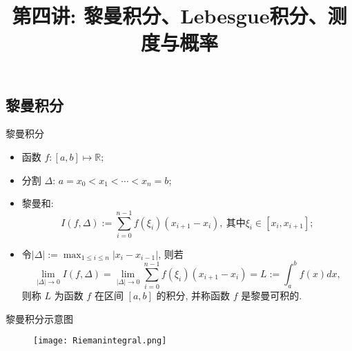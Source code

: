 \title[概率论]{第四讲: 黎曼积分、{\rm Lebesgue}积分、测度与概率 }
\date{}
{ 
	\begin{frame}
		\titlepage
	\end{frame}
}

\subsection{黎曼积分}
\begin{frame}{黎曼积分}
	\begin{itemize}[<+-|alert@+>]
		\item 函数 $f:[a,b]\mapsto \mathbb{R}$;
		\item 分割 $\Delta$: $a=x_0<x_1<\cdots<x_n=b$;
		\item 黎曼和:
		\[I(f,\Delta):=\sum_{i=0}^{n-1}f(\xi_i)(x_{i+1}-x_i), \ \mbox{其中} \xi_i\in[x_i,x_{i+1}]; \]
		\item 令$|\Delta|:=\max_{1\leq i\leq n}|x_i-x_{i-1}|$, 则若
		\[\lim_{|\Delta|\rightarrow 0}I(f,\Delta)=\lim_{|\Delta|\rightarrow 0}\sum_{i=0}^{n-1}f(\xi_i)(x_{i+1}-x_i)=L:=\int_a^bf(x)dx,\]
		则称 $L$ 为函数 $f$ 在区间 $[a,b]$ 的积分, 并称函数 $f$ 是黎曼可积的.
	\end{itemize}

\end{frame}
\begin{frame}{黎曼积分示意图}
	\begin{figure}[htbp]
		\centering
		\texttt{[image: Riemanintegral.png]}
	\end{figure}
\end{frame}

